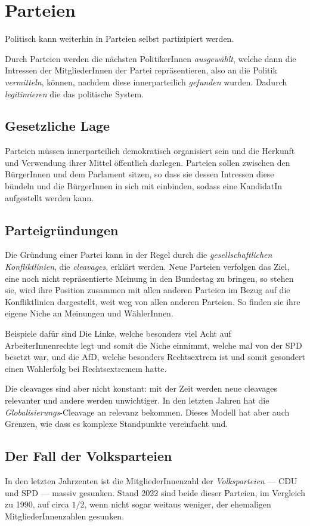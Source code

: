 \documentclass{article}
\begin{document}
\section{Parteien}
Politisch kann weiterhin in Parteien selbst partizipiert werden.
 
Durch Parteien werden die nächsten PolitikerInnen \emph{ausgewählt}, welche dann die Intressen der MitgliederInnen der Partei repräsentieren, also an die Politik \emph{vermitteln}, können, nachdem diese innerparteilich \emph{gefunden} wurden. Dadurch \emph{legitimieren} die das politische System. 
 
\subsection{Gesetzliche Lage}
Parteien müssen innerparteilich demokratisch organisiert sein und die Herkunft und Verwendung ihrer Mittel öffentlich darlegen. Parteien sollen zwischen den BürgerInnen und dem Parlament sitzen, so dass sie dessen Intressen diese bündeln und die BürgerInnen in sich mit einbinden, sodass eine KandidatIn aufgestellt werden kann.
 
\subsection{Parteigründungen}
Die Gründung einer Partei kann in der Regel durch die \emph{gesellschaftlichen Konfliktlinien}, die \emph{cleavages}, erklärt werden. Neue Parteien verfolgen das Ziel, eine noch nicht repräsentierte Meinung in den Bundestag zu bringen, so stehen sie, wird ihre Position zusammen mit allen anderen Parteien im Bezug auf die Konfliktlinien dargestellt, weit weg von allen anderen Parteien. So finden sie ihre eigene Niche an Meinungen und WählerInnen. 
 
Beispiele dafür sind Die Linke, welche besonders viel Acht auf ArbeiterInnenrechte legt und somit die Niche einnimmt, welche mal von der SPD besetzt war, und die AfD, welche besonders Rechtsextrem ist und somit gesondert einen Wahlerfolg bei Rechtsextremem hatte.
 
Die cleavages sind aber nicht konstant: mit der Zeit werden neue cleavages relevanter und andere werden unwichtiger. In den letzten Jahren hat die \emph{Globalisierungs}-Cleavage an relevanz bekommen. Dieses Modell hat aber auch Grenzen, wie dass es komplexe Standpunkte vereinfacht und. 
 
\subsection{Der Fall der Volksparteien}
In den letzten Jahrzenten ist die MitgliederInnenzahl der \emph{Volksparteien} --- CDU und SPD --- massiv gesunken. Stand 2022 sind beide dieser Parteien, im Vergleich zu 1990, auf circa $1/2$, wenn nicht sogar weitaus weniger, der ehemaligen MitgliederInnenzahlen gesunken. 
\end{document}
